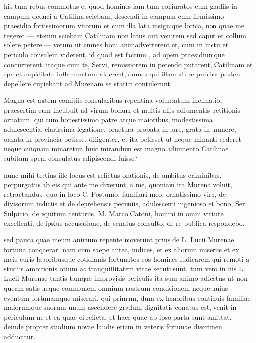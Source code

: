  his tum rebus commotus et quod homines iam tum coniuratos cum gladiis in campum deduci a Catilina sciebam, descendi in campum cum firmissimo praesidio fortissimorum virorum et cum illa lata insignique lorica, non quae me tegeret — etenim sciebam Catilinam non latus aut ventrem sed caput et collum solere petere — verum ut omnes boni animadverterent et, cum in metu et periculo consulem viderent, id quod est factum , ad opem praesidiumque concurrerent. itaque cum te, Servi, remissiorem in petendo putarent, Catilinam et spe et cupiditate inflammatum viderent, omnes qui illam ab re publica pestem depellere cupiebant ad Murenam se statim contulerunt.

 Magna est autem comitiis consularibus repentina voluntatum inclinatio, praesertim cum incubuit ad virum bonum et multis aliis adiumentis petitionis ornatum. qui cum honestissimo patre atque maioribus, modestissima adulescentia, clarissima legatione, praetura probata in iure, grata in munere, ornata in provincia petisset diligenter, et ita petisset ut neque minanti cederet neque cuiquam minaretur, huic mirandum est magno adiumento Catilinae subitam spem consulatus adipiscendi fuisse?

 nunc mihi tertius ille locus est relictus orationis, de ambitus criminibus, perpurgatus ab eis qui ante me dixerunt, a me, quoniam ita Murena voluit, retractandus; quo in loco C. Postumo, familiari meo, ornatissimo viro, de divisorum indiciis et de deprehensis pecuniis, adulescenti ingenioso et bono, Ser. Sulpicio, de equitum centuriis, M. Marco Catoni, homini in omni virtute excellenti, de ipsius accusatione, de senatus consulto, de re publica respondebo.

 sed pauca quae meum animum repente moverunt prius de L. Lucii Murenae fortuna conquerar. nam cum saepe antea, iudices, et ex aliorum miseriis et ex meis curis laboribusque cotidianis fortunatos eos homines iudicarem qui remoti a studiis ambitionis otium ac tranquillitatem vitae secuti sunt, tum vero in his L. Lucii Murenae tantis tamque improvisis periculis ita sum animo adfectus ut non queam satis neque communem omnium nostrum condicionem neque huius eventum fortunamque miserari. qui primum, dum ex honoribus continuis familiae maiorumque suorum unum ascendere gradum dignitatis conatus est, venit in periculum ne et ea quae ei relicta, et haec quae ab ipso parta sunt amittat, deinde propter studium novae laudis etiam in veteris fortunae discrimen adducitur.

